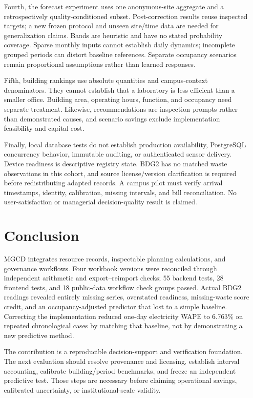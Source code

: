 \documentclass[conference]{IEEEtran}
\begin{document}
Fourth, the forecast experiment uses one anonymous-site aggregate and a retrospectively quality-conditioned subset. Post-correction results reuse inspected targets; a new frozen protocol and unseen site/time data are needed for generalization claims. Bands are heuristic and have no stated probability coverage. Sparse monthly inputs cannot establish daily dynamics; incomplete grouped periods can distort baseline references. Separate occupancy scenarios remain proportional assumptions rather than learned responses.

Fifth, building rankings use absolute quantities and campus-context denominators. They cannot establish that a laboratory is less efficient than a smaller office. Building area, operating hours, function, and occupancy need separate treatment. Likewise, recommendations are inspection prompts rather than demonstrated causes, and scenario savings exclude implementation feasibility and capital cost.

Finally, local database tests do not establish production availability, PostgreSQL concurrency behavior, immutable auditing, or authenticated sensor delivery. Device readiness is descriptive registry state. BDG2 has no matched waste observations in this cohort, and source license/version clarification is required before redistributing adapted records. A campus pilot must verify arrival timestamps, identity, calibration, missing intervals, and bill reconciliation. No user-satisfaction or managerial decision-quality result is claimed.

\section{Conclusion}
MGCD integrates resource records, inspectable planning calculations, and governance workflows. Four workbook versions were reconciled through independent arithmetic and export--reimport checks; 55 backend tests, 28 frontend tests, and 18 public-data workflow check groups passed. Actual BDG2 readings revealed entirely missing series, overstated readiness, missing-waste score credit, and an occupancy-adjusted predictor that lost to a simple baseline. Correcting the implementation reduced one-day electricity WAPE to 6.763\% on repeated chronological cases by matching that baseline, not by demonstrating a new predictive method.

The contribution is a reproducible decision-support and verification foundation. The next evaluation should resolve provenance and licensing, establish interval accounting, calibrate building/period benchmarks, and freeze an independent predictive test. Those steps are necessary before claiming operational savings, calibrated uncertainty, or institutional-scale validity.
\end{document}
